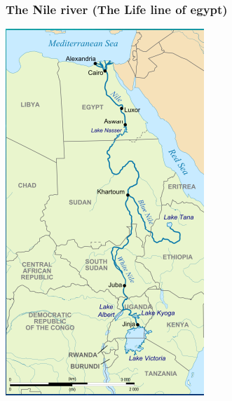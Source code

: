 \documentclass[11pt]{article}
\begin{document}
\subsubsection{The Nile river (The Life line of egypt)}
\label{sec-4-5-1}
\includegraphics[width=.9\linewidth]{img/modNile.png}
\end{document}
